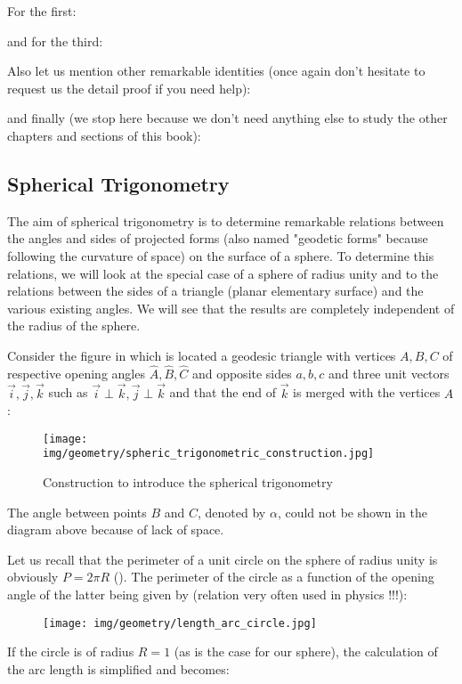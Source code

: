 	For the first:
	
	and for the third:
	
	Also let us mention other remarkable identities (once again don't hesitate to request us the detail proof if you need help):
	
 	and finally (we stop here because we don't need anything else to study the other chapters and sections of this book):
 	
	
	\pagebreak
	\subsection{Spherical Trigonometry}\label{spherical trigonometry}
	The aim of spherical trigonometry is to determine remarkable relations between the angles and sides of projected forms (also named "geodetic forms" because following the curvature of space) on the surface of a sphere. To determine this relations, we will look at the special case of a sphere of radius unity and to the relations between the sides of a triangle (planar elementary surface) and the various existing angles. We will see that the results are completely independent of the radius of the sphere.
	
	Consider the figure in which is located a geodesic triangle with vertices $A, B, C$ of respective opening angles $\hat{A}, \hat{B}, \hat{C}$ and opposite sides $a, b, c$ and three unit vectors $\vec{i}, \vec{j}, \vec{k}$ such as $\vec{i} \perp \vec{k}, \vec{j} \perp \vec{k}$ and that the end of $\vec{k}$ is merged with the vertices $A$:
	\begin{figure}[H]
	\centering
	\texttt{[image: img/geometry/spheric\_trigonometric\_construction.jpg]}
	\caption{Construction to introduce the spherical trigonometry}
	\end{figure}
	The angle between points $B$ and $C$, denoted by $\alpha$, could not be shown in the diagram above because of lack of space.
	
	Let us recall that the perimeter of a unit circle on the sphere of radius unity is obviously $P=2\pi R$ (). The perimeter of the circle as a function of the opening angle of the latter being given by (relation very often used in physics !!!)\label{arc length trigonometry}:
	
	\begin{figure}[H]
	\centering
	\texttt{[image: img/geometry/length\_arc\_circle.jpg]}
	\end{figure}
	If the circle is of radius $R=1$ (as is the case for our sphere), the calculation of the arc length is simplified and becomes:
	
